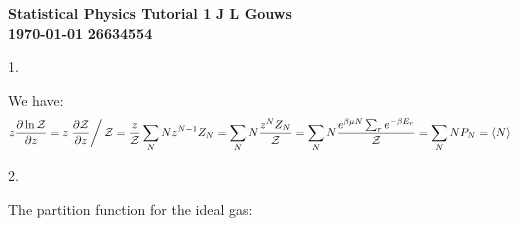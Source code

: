 \documentclass[a4paper,12pt]{article}
\newcommand\block[1]{\hspace*{#1}}
\begin{document}
\selectfont
{\Large \textbf{Statistical Physics Tutorial 1}} \hfill {\Large \textbf{J L Gouws}}\\
\block{1.0cm} {\large \textbf{\today}} \hfill {\large \textbf{26634554}}\\
\thispagestyle{empty}

1.
\begin{minipage}[t]{0.9\textwidth}
  We have:
  \begin{align*}
    z \frac{ \partial \ln \mathcal{Z}}{\partial z} = z\left. \frac{\partial \mathcal{Z}}{\partial z} \right/ \mathcal{Z} = \frac{z}{\mathcal{Z}} \sum_{N} N z^{N - 1} Z_N = \sum_{N} N \frac{z^{N} Z_N}{\mathcal{Z}}= \sum_{N} N \frac{e^{\beta \mu N} \sum_re^{-\beta E_r}}{\mathcal{Z}} = \sum_{N} N P_N = \langle N \rangle
  \end{align*}
\end{minipage}

2.
\begin{minipage}[t]{0.9\textwidth}
  The partition function for the ideal gas:
  
\end{minipage}
\end{document}
